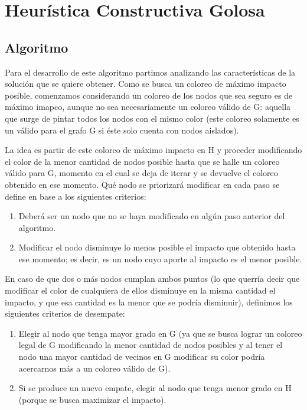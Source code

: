 \section{Heurística Constructiva Golosa}

\subsection{Algoritmo}
Para el desarrollo de este algoritmo partimos analizando las características de la soluci\'on que se quiere obtener. 
Como se busca un coloreo de máximo impacto posible, comenzamos considerando un coloreo de los nodos que sea seguro es de m\'aximo imapco, aunque no sea necesariamente un coloreo válido de G: aquella que surge de pintar todos los nodos con el mismo color (este coloreo solamente es un v\'alido para el grafo G si \'este solo cuenta con nodos aislados). 

La idea es partir de este coloreo de m\'aximo impacto en H y proceder modificando el color de la menor cantidad de nodos posible hasta que se halle un coloreo válido para G, momento en el cual se deja de iterar y se devuelve el coloreo obtenido en ese momento. Qué nodo se priorizar\'a modificar en cada paso se define en base a los siguientes criterios:

\begin{enumerate}
	\item Deberá ser un nodo que no se haya modificado en algún paso anterior del algoritmo.
	\item Modificar el nodo disminuye lo menos posible el impacto que obtenido hasta ese momento; es decir, es un nodo cuyo aporte al impacto es el menor posible.
\end{enumerate}

En caso de que dos o más nodos cumplan ambos puntos (lo que querría decir que modificar el color de cualquiera de ellos disminuye en la misma cantidad el impacto, y que esa cantidad es la menor que se podría disminuir), definimos los siguientes criterios de desempate: 

\begin{enumerate}
	\item Elegir al nodo que tenga mayor grado en G (ya que se busca lograr un coloreo legal de G modificando la menor cantidad de nodos posibles y al tener el nodo una mayor cantidad de vecinos en G modificar su color podría acercarnos más a un coloreo válido de G). 
	\item Si se produce un nuevo empate, elegir al nodo que tenga menor grado en H (porque se busca maximizar el impacto).
\end{enumerate}

